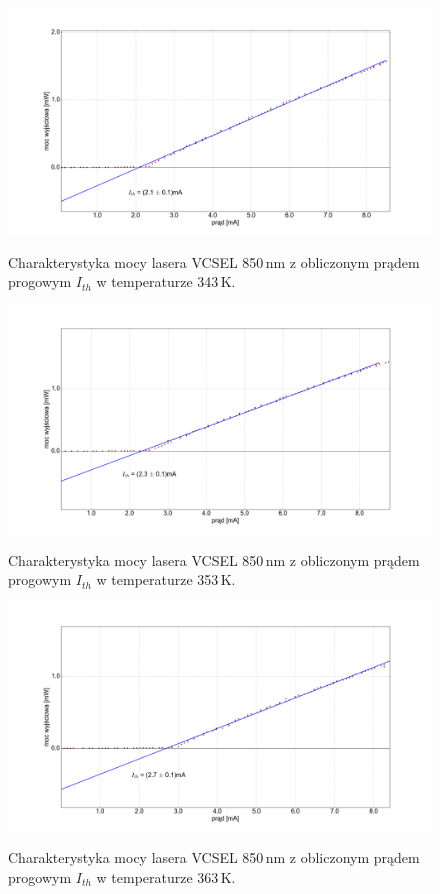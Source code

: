 \documentclass[a4paper, portrait,12pt]{report}
\begin{document}
\begin{figure}
\center
  \includegraphics[scale=0.30]{plot_vcsel850/temp_70_fit.png}
  \label{rys1}
  \caption{Charakterystyka mocy lasera VCSEL 850\,nm z obliczonym prądem progowym $I_{th}$ w temperaturze 343\,K.} 
\end{figure}

\begin{figure}
\center
  \includegraphics[scale=0.30]{plot_vcsel850/temp_80_fit.png}
  \label{rys1}
  \caption{Charakterystyka mocy lasera VCSEL 850\,nm z obliczonym prądem progowym $I_{th}$ w temperaturze 353\,K.} 
\end{figure}

\begin{figure}
\center
  \includegraphics[scale=0.30]{plot_vcsel850/temp_90_fit.png}
  \label{rys1}
  \caption{Charakterystyka mocy lasera VCSEL 850\,nm z obliczonym prądem progowym $I_{th}$ w temperaturze 363\,K.} 
\end{figure}
\end{document}
